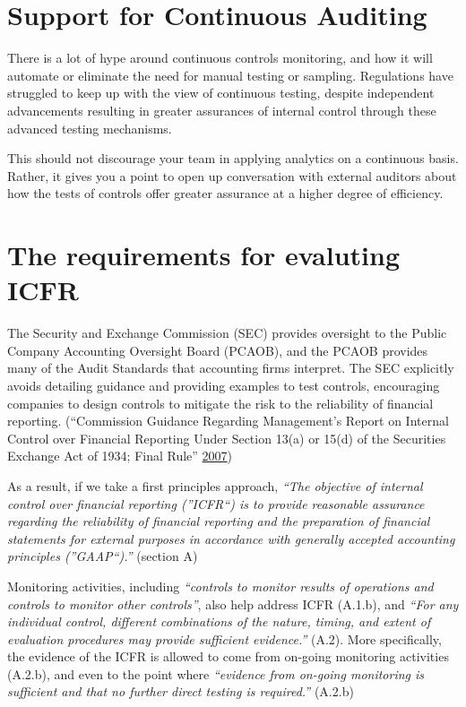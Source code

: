 \documentclass[
]{book}
\begin{document}
\hypertarget{support-for-continuous-auditing}{%
\section{Support for Continuous Auditing}\label{support-for-continuous-auditing}}

There is a lot of hype around continuous controls monitoring, and how it will automate or eliminate the need for manual testing or sampling. Regulations have struggled to keep up with the view of continuous testing, despite independent advancements resulting in greater assurances of internal control through these advanced testing mechanisms.

This should not discourage your team in applying analytics on a continuous basis. Rather, it gives you a point to open up conversation with external auditors about how the tests of controls offer greater assurance at a higher degree of efficiency.

\hypertarget{the-requirements-for-evaluting-icfr}{%
\section{The requirements for evaluting ICFR}\label{the-requirements-for-evaluting-icfr}}

The Security and Exchange Commission (SEC) provides oversight to the Public Company Accounting Oversight Board (PCAOB), and the PCAOB provides many of the Audit Standards that accounting firms interpret. The SEC explicitly avoids detailing guidance and providing examples to test controls, encouraging companies to design controls to mitigate the risk to the reliability of financial reporting. (``Commission Guidance Regarding Management's Report on Internal Control over Financial Reporting Under Section 13(a) or 15(d) of the Securities Exchange Act of 1934; Final Rule'' \protect\hyperlink{ref-sec-princples-based}{2007})

As a result, if we take a first principles approach, \emph{``The objective of internal control over financial reporting (''ICFR``) is to provide reasonable assurance regarding the reliability of financial reporting and the preparation of financial statements for external purposes in accordance with generally accepted accounting principles (''GAAP``).''} (section A)

Monitoring activities, including \emph{``controls to monitor results of operations and controls to monitor other controls''}, also help address ICFR (A.1.b), and \emph{``For any individual control, different combinations of the nature, timing, and extent of evaluation procedures may provide sufficient evidence.''} (A.2). More specifically, the evidence of the ICFR is allowed to come from on-going monitoring activities (A.2.b), and even to the point where \emph{``evidence from on-going monitoring is sufficient and that no further direct testing is required.''} (A.2.b)
\end{document}
